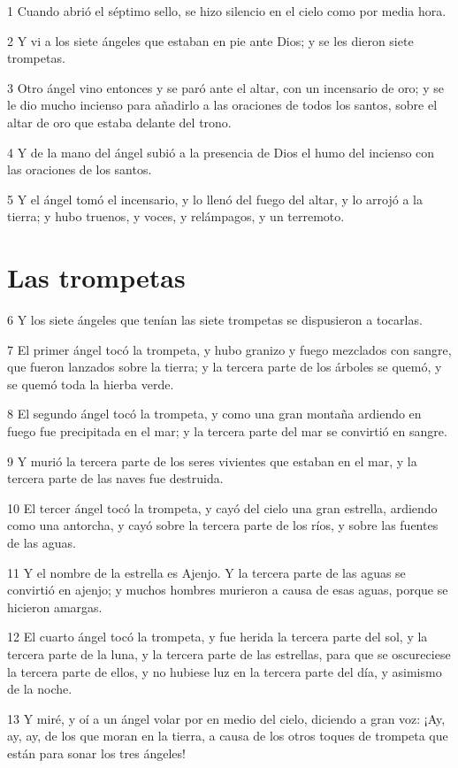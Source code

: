 \par 1 Cuando abrió el séptimo sello, se hizo silencio en el cielo como por media hora.
\par 2 Y vi a los siete ángeles que estaban en pie ante Dios; y se les dieron siete trompetas.
\par 3 Otro ángel vino entonces y se paró ante el altar, con un incensario de oro; y se le dio mucho incienso para añadirlo a las oraciones de todos los santos, sobre el altar de oro que estaba delante del trono.
\par 4 Y de la mano del ángel subió a la presencia de Dios el humo del incienso con las oraciones de los santos.
\par 5 Y el ángel tomó el incensario, y lo llenó del fuego del altar, y lo arrojó a la tierra; y hubo truenos, y voces, y relámpagos, y un terremoto.

\section*{Las trompetas}

\par 6 Y los siete ángeles que tenían las siete trompetas se dispusieron a tocarlas.
\par 7 El primer ángel tocó la trompeta, y hubo granizo y fuego mezclados con sangre, que fueron lanzados sobre la tierra; y la tercera parte de los árboles se quemó, y se quemó toda la hierba verde.
\par 8 El segundo ángel tocó la trompeta, y como una gran montaña ardiendo en fuego fue precipitada en el mar; y la tercera parte del mar se convirtió en sangre.
\par 9 Y murió la tercera parte de los seres vivientes que estaban en el mar, y la tercera parte de las naves fue destruida.
\par 10 El tercer ángel tocó la trompeta, y cayó del cielo una gran estrella, ardiendo como una antorcha, y cayó sobre la tercera parte de los ríos, y sobre las fuentes de las aguas.
\par 11 Y el nombre de la estrella es Ajenjo. Y la tercera parte de las aguas se convirtió en ajenjo; y muchos hombres murieron a causa de esas aguas, porque se hicieron amargas.
\par 12 El cuarto ángel tocó la trompeta, y fue herida la tercera parte del sol, y la tercera parte de la luna, y la tercera parte de las estrellas, para que se oscureciese la tercera parte de ellos, y no hubiese luz en la tercera parte del día, y asimismo de la noche.
\par 13 Y miré, y oí a un ángel volar por en medio del cielo, diciendo a gran voz: ¡Ay, ay, ay, de los que moran en la tierra, a causa de los otros toques de trompeta que están para sonar los tres ángeles!

